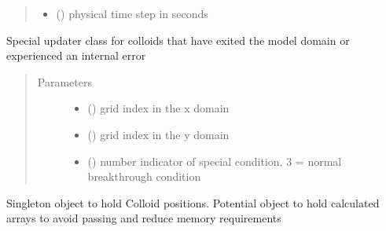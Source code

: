 \documentclass[letterpaper,10pt,english]{sphinxmanual}
\begin{document}
\begin{fulllineitems}
\begin{fulllineitems}
\begin{quote}
\begin{description}
\begin{itemize}
\item {} 
 () \textendash{} physical time step in seconds

\end{itemize}

\end{description}\end{quote}

\end{fulllineitems}


\begin{fulllineitems}
\label{\detokenize{index:lb_colloids.Colloids.LB_Colloid.Colloid.update_special}}
Special updater class for colloids that have exited the model
domain or experienced an internal error
\begin{quote}\begin{description}
\item[{Parameters}] \leavevmode\begin{itemize}
\item {} 
 () \textendash{} grid index in the x domain

\item {} 
 () \textendash{} grid index in the y domain

\item {} 
 () \textendash{} number indicator of special condition. 3 = normal breakthrough condition

\end{itemize}

\end{description}\end{quote}

\end{fulllineitems}


\end{fulllineitems}


\begin{fulllineitems}
\label{\detokenize{index:lb_colloids.Colloids.LB_Colloid.Singleton}}
Singleton object to hold Colloid positions. Potential object to hold
calculated arrays to avoid passing and reduce memory requirements

\end{fulllineitems}
\end{document}
